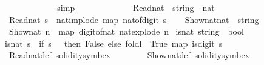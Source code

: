 \begin{isabellebody}
\ {\isacharasterisk}{\kern0pt}{\isacharasterisk}{\kern0pt}\ \isanewline
\ \ \ \ \ \ \ \ \isamarkupfalse%
\ simp\isanewline
\ \ \ \ \ \ \isamarkupfalse%
\isanewline
\ \ \isamarkupfalse%
\isanewline
{}\isamarkupfalse%
%
\endisatagproof
{\isafoldproof}%
%
\isadelimproof
\isanewline
%
\endisadelimproof
\isanewline
{}\isamarkupfalse%
\ \isanewline
\ \ Read\isactrlsub n\isactrlsub a\isactrlsub t\ {\isacharcolon}{\kern0pt}{\isacharcolon}{\kern0pt}\ {\isacartoucheopen}string\ {\isasymRightarrow}\ nat{\isacartoucheclose}\ \ \isanewline
\ {\isacartoucheopen}Read\isactrlsub n\isactrlsub a\isactrlsub t\ s\ {\isacharequal}{\kern0pt}\ nat{\isacharunderscore}{\kern0pt}implode\ {\isacharparenleft}{\kern0pt}map\ nat{\isacharunderscore}{\kern0pt}of{\isacharunderscore}{\kern0pt}digit\ s{\isacharparenright}{\kern0pt}{\isacartoucheclose}\isanewline
\isanewline
\isanewline
\isanewline
{}\isamarkupfalse%
\ \isanewline
\ \ Show\isactrlsub n\isactrlsub a\isactrlsub t{\isacharcolon}{\kern0pt}{\isacharcolon}{\kern0pt}{\isachardoublequoteopen}nat\ {\isasymRightarrow}\ string{\isachardoublequoteclose}\ \isanewline
\ {\isacartoucheopen}Show\isactrlsub n\isactrlsub a\isactrlsub t\ n\ {\isacharequal}{\kern0pt}\ map\ digit{\isacharunderscore}{\kern0pt}of{\isacharunderscore}{\kern0pt}nat\ {\isacharparenleft}{\kern0pt}nat{\isacharunderscore}{\kern0pt}explode\ n{\isacharparenright}{\kern0pt}{\isacartoucheclose}\isanewline
\isanewline
\isanewline
{}\isamarkupfalse%
\ is{\isacharunderscore}{\kern0pt}nat{\isacharcolon}{\kern0pt}{\isacharcolon}{\kern0pt}\ {\isachardoublequoteopen}string\ {\isasymRightarrow}\ bool{\isachardoublequoteclose}\ \isanewline
{\isachardoublequoteopen}is{\isacharunderscore}{\kern0pt}nat\ s\ {\isacharequal}{\kern0pt}\ {\isacharparenleft}{\kern0pt}if\ s\ {\isacharequal}{\kern0pt}\ {\isacharbrackleft}{\kern0pt}{\isacharbrackright}{\kern0pt}\ then\ False\ else\ foldl\ {\isacharparenleft}{\kern0pt}{\isasymand}{\isacharparenright}{\kern0pt}\ True\ {\isacharparenleft}{\kern0pt}map\ is{\isacharunderscore}{\kern0pt}digit\ s{\isacharparenright}{\kern0pt}{\isacharparenright}{\kern0pt}{\isachardoublequoteclose}\isanewline
\isanewline
{}\isamarkupfalse%
\ Read\isactrlsub n\isactrlsub a\isactrlsub t{\isacharunderscore}{\kern0pt}def\ {\isacharbrackleft}{\kern0pt}solidity{\isacharunderscore}{\kern0pt}symbex{\isacharbrackright}{\kern0pt}\isanewline
\ \ \ \ \ \ \ \ Show\isactrlsub n\isactrlsub a\isactrlsub t{\isacharunderscore}{\kern0pt}def\ {\isacharbrackleft}{\kern0pt}solidity{\isacharunderscore}{\kern0pt}symbex{\isacharbrackright}{\kern0pt}\isanewline

\end{isabellebody}
